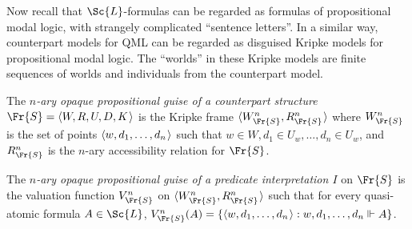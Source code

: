 \documentclass[11pt]{woarticle}
\newcommand{\cmnt}[1]{\iffalse #1 \fi}
\theoremstyle{break}
\theoremstyle{nonumberplain}
\newcommand{\SAT}{\Vdash}
\newcommand{\1}{\;\,|\;\,}
\renewcommand{\t}[1]{\ensuremath{\langle #1  \makebox[.2ex]{}\rangle}}
\begin{document}
\cmnt{%
  I could include the substitution operator in the language here. I wouldn't
  make any difference.

  Definition \ref{!SATSEQ} looks just like standard Kripke semantics for a
  propositional modal language with multiple box operators $\Box$,
  $\forall v_1,\ldots,\forall v_r$,
  $\t{v_1:v_1},\t{v_1:v_2},\ldots,\t{v_r:v_r}$, all governed by their own
  accessibility relation between points of the form $w,d_1,\ldots,d_r$. (As
  mentioned on p.\ \pageref{kuhn}, there is a bit of redundancy here: if we have
  substitution operators, a single box operator $\forall v_1$ would be enough.)

  Clearly the evaluation of a formula whose only box operator is $\Box$ does not
  depend on the accessibility relations associated with the quantificational box
  operators ($\forall x$, $\t{y:x}$). As we will see, the same is true if we
  consider the evaluation of modal \emph{schemas} like $\Box A \then A$, i.e.\
  the set of formulas that result from $\Box p \then p$ by uniformly
  substituting arbitrary $\Sc{L}$-formulas for $p$. In this way, every purely
  modal schema corresponds to a constraint on the sequential accessibility
  relations in counterpart structures.
} %

Now recall that $\Sc{L}$-formulas can be regarded as formulas of propositional
modal logic, with strangely complicated ``sentence letters''. In a similar way,
counterpart models for QML can be regarded as disguised Kripke models for
propositional modal logic. The ``worlds'' in these Kripke models are finite
sequences of worlds and individuals from the counterpart model.

\begin{definition}{\label{!OPAQUE}}
  The \emph{$n$-ary opaque propositional guise of a counterpart structure}
  $\Fr{S}=\t{W,R,U,D,K}$ is the Kripke frame $\t{W^n_{\Fr{S}},R^n_{\Fr{S}}}$
  where $W^n_{\Fr{S}}$ is the set of points $\t{w,d_1,\ldots,d_n}$ such that
  $w\in W, d_1 \in U_w, \ldots, d_n\in U_w$, and $R^n_{\Fr{S}}$ is the
  $n$-ary accessibility relation for $\Fr{S}$.

  The \emph{$n$-ary opaque propositional guise of a predicate interpretation
    $I$} on $\Fr{S}$ is the valuation function $V^n_{\Fr{S}}$ on
  $\t{W^n_{\Fr{S}},R^n_{\Fr{S}}}$ such that for every quasi-atomic formula
  $A \in \Sc{L}$,
  $V^n_{\Fr{S}}(A) = \{ \t{w,d_1,\ldots,d_n} : w,d_1,\ldots,d_n \SAT A \}$.
\end{definition}
\end{document}
